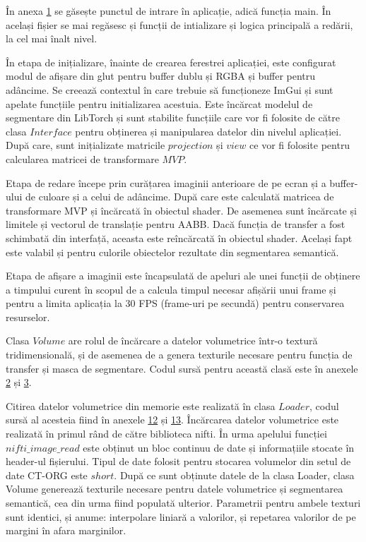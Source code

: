 În anexa \hyperref[appendix:1_main_cpp]{1} se găsește punctul de intrare în aplicație, adică funcția main. În același fișier se mai regăsesc și funcții de intializare și logica principală a redării, la cel mai înalt nivel. 

În etapa de inițializare, înainte de crearea ferestrei aplicației, este configurat modul de afișare din glut pentru buffer dublu și RGBA și buffer pentru adâncime. Se creează contextul în care trebuie să funcționeze ImGui și sunt apelate funcțiile pentru initializarea acestuia. Este încărcat modelul de segmentare din LibTorch și sunt stabilite funcțiile care vor fi folosite de către clasa $Interface$ pentru obținerea și manipularea datelor din nivelul aplicației. După care, sunt inițializate matricile $projection$ și $view$ ce vor fi folosite pentru calcularea matricei de transformare $MVP$.

Etapa de redare începe prin curățarea imaginii anterioare de pe ecran și a buffer-ului de culoare și a celui de adâncime. După care este calculată matricea de transformare MVP și încărcată în obiectul shader. De asemenea sunt încărcate și limitele și vectorul de translație pentru AABB. Dacă funcția de transfer a fost schimbată din interfață, aceasta este reîncărcată în obiectul shader. Același fapt este valabil și pentru culorile obiectelor rezultate din segmentarea semantică.

Etapa de afișare a imaginii este încapsulată de apeluri ale unei funcții de obținere a timpului curent în scopul de a calcula timpul necesar afișării unui frame și pentru a limita aplicația la 30 FPS (frame-uri pe secundă) pentru conservarea resurselor.

Clasa $Volume$ are rolul de încărcare a datelor volumetrice într-o textură tridimensională, și de asemenea de a genera texturile necesare pentru funcția de transfer și masca de segmentare. Codul sursă pentru această clasă este în anexele \hyperref[appendix:2_volume_h]{2} și \hyperref[appendix:3_volume_cpp]{3}. 

Citirea datelor volumetrice din memorie este realizată în clasa $Loader$, codul sursă al acesteia fiind în anexele \hyperref[appendix:12_loader_h]{12} și \hyperref[appendix:13_loader_cpp]{13}. Încărcarea datelor volumetrice este realizată în primul rând de către biblioteca nifti. În urma apelului funcției $nifti\_image\_read$ este obținut un bloc continuu de date și informațiile stocate în header-ul fișierului. Tipul de date folosit pentru stocarea volumelor din setul de date CT-ORG este $short$. După ce sunt obținute datele de la clasa Loader, clasa Volume generează texturile necesare pentru datele volumetrice și segmentarea semantică, cea din urma fiind populată ulterior. Parametrii pentru ambele texturi sunt identici, și anume: interpolare liniară a valorilor, și repetarea valorilor de pe margini în afara marginilor. 

